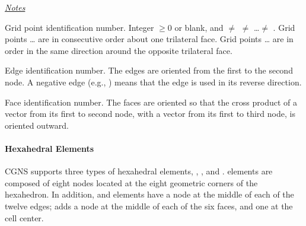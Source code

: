 {{{\medskip

\uline{\textit{Notes}}

\begin{Ventryi}{}
   \item [\fort{N1,\ldots,N18}]
         Grid point identification number.
         Integer $\ge 0$ or blank, and  $\ne$ 
         $\ne$ \ldots $\ne$ .
         Grid points \ldots{} are in consecutive order about
         one trilateral face.
         Grid points \ldots{} are in order in the same
         direction around the opposite trilateral face.
   \item [\fort{E1,\ldots,E9}]
         Edge identification number.
         The edges are oriented from the first to the second node.
         A negative edge (e.g., ) means that the edge is used in
         its reverse direction.
   \item [\fort{F1,\ldots,F5}]
         Face identification number.
         The faces are oriented so that the cross product of a vector
         from its first to second node, with a vector from its first to
         third node, is oriented outward.
\end{Ventryi}

\paragraph{Hexahedral Elements}
CGNS supports three types of hexahedral elements, ,
, and .
 elements are composed of eight nodes located at the
eight geometric corners of the hexahedron.
In addition,  and  elements have a node
at the middle of each of the twelve edges;  adds a
node at the middle of each of the six faces, and one at the cell center.

}}}
